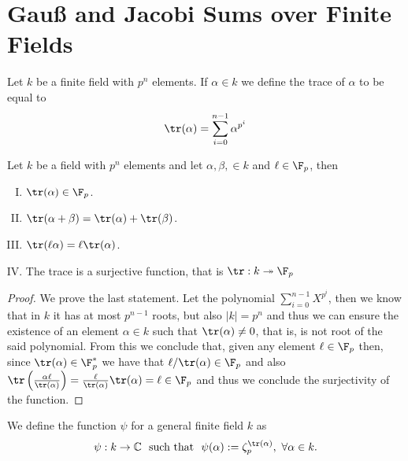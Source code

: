 \section{Gau{\ss} and Jacobi Sums over Finite Fields}

\begin{definition}[Trace]
    Let \(k\) be a finite field with \(p^n\) elements. If  \(\alpha \in k\) we
    define the trace of \(\alpha\) to be equal to
    \[
        \tr(\alpha) = \sum_{i=0}^{n-1} \alpha^{p^{i}}
    \]
\end{definition}

\begin{proposition}
    Let \(k\) be a field with  \(p^n\) elements and let \(\alpha, \beta, \in k\)
    and \(\ell \in \F_p\), then
    \begin{enumerate}[I.]
        \item \(\tr(\alpha) \in \F_p\).
        \item \(\tr(\alpha + \beta) = \tr(\alpha) + \tr(\beta)\).
        \item \(\tr(\ell\alpha) = \ell \tr(\alpha)\).
        \item The trace is a surjective function, that is \( \tr : k
              \twoheadrightarrow \F_p \)
    \end{enumerate}
\end{proposition}

\begin{proof}
    We prove the last statement. Let the polynomial \(\sum_{i=0}^{n-1} X^{p^i}\),
    then we know that in \(k\) it has at most \(p^{n-1}\) roots, but also  \(|k|
    = p^n\) and thus we can ensure the existence of an element \(\alpha \in
    k\) such that \(\tr(\alpha) \neq 0\), that is, is not root of the said
    polynomial. From this we conclude that, given any element \(\ell \in \F_p\)
    then, since \(\tr(\alpha) \in \F_p^\ast\) we have that \(\ell/\tr(\alpha) \in
    \F_p\) and also \(\tr\left( \frac{\alpha\ell}{\tr(\alpha)} \right) =
    \frac{\ell}{\tr(\alpha)}\tr(\alpha) = \ell \in \F_p \) and thus we conclude
    the surjectivity of the function.
\end{proof}

\begin{definition}
    We define the function \(\psi\) for a general finite field \(k\) as
    \[
        \psi:k \to \mathbb{C}\ \text{ such that }\ \psi(\alpha) :=
        \zeta_p^{\tr(\alpha)},\  \forall \alpha \in k.
    \]
\end{definition}

